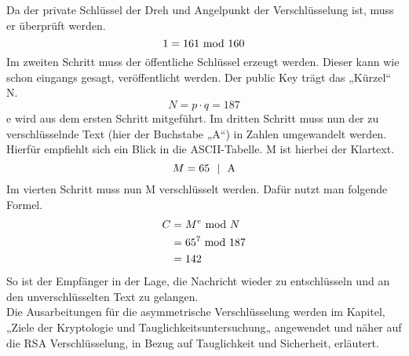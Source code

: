 Da der private Schlüssel der Dreh und Angelpunkt der Verschlüsselung ist, muss er überprüft werden.\\

\begin{equation}
	1 = 161 \textmd{~mod~} 160
\end{equation}
Im zweiten Schritt muss der öffentliche Schlüssel erzeugt werden. Dieser kann wie schon eingangs gesagt, veröffentlicht werden. Der public Key trägt das „Kürzel“ N.
\begin{equation}
	N = p \cdot q = 187
\end{equation}
e wird aus dem ersten Schritt mitgeführt. Im dritten Schritt muss nun der zu verschlüsselnde Text (hier der Buchstabe „A“) in Zahlen umgewandelt werden. Hierfür empfiehlt sich ein Blick in die ASCII-Tabelle. M ist hierbei der Klartext.
\begin{equation}
	M = 65  \textmd{~ | ~A}
\end{equation}
Im vierten Schritt muss nun M verschlüsselt werden. Dafür nutzt man folgende Formel.
\begin{align}
	C &= M^e \textmd{~mod~} N\\
	&= 65^7 \textmd{~mod~} 187\\
	& = 142
\end{align}
So ist der Empfänger in der Lage, die Nachricht wieder zu entschlüsseln und an den unverschlüsselten Text zu gelangen. \cite{facharbeit} \\	
Die Ausarbeitungen für die asymmetrische Verschlüsselung werden im Kapitel, „Ziele der Kryptologie und Tauglichkeitsuntersuchung„ angewendet und näher auf die RSA Verschlüsselung, in Bezug auf Tauglichkeit und Sicherheit, erläutert. \\

	